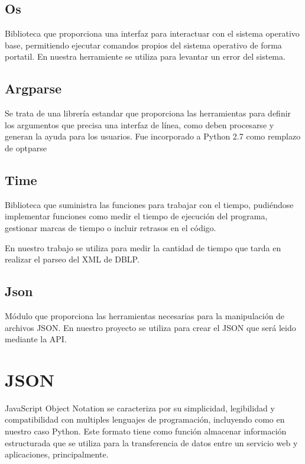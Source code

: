 \documentclass[a4paper, 12pt]{book}
\begin{document}
\subsection{Os}

Biblioteca que proporciona una interfaz para interactuar con el sistema operativo base, permitiendo ejecutar comandos propios del sistema operativo de forma portatil. En nuestra herramiente se utiliza para levantar un error del sistema.

\subsection{Argparse}

Se trata de una librería estandar que proporciona las herramientas para definir los argumentos que precisa una interfaz de línea, como deben procesarse y generan la ayuda para los usuarios. Fue incorporado a Python 2.7 como remplazo de optparse

\subsection{Time}

Biblioteca que suministra las funciones para trabajar con el tiempo, pudiéndose implementar funciones como medir el tiempo de ejecución del programa, gestionar marcas de tiempo o incluir retrasos en el código.

En nuestro trabajo se utiliza para medir la cantidad de tiempo que tarda en realizar el parseo del XML de DBLP.

\subsection{Json}

Módulo que proporciona las herramientas necesarias para la manipulación de archivos JSON. En nuestro proyecto se utiliza para crear el JSON que será leido mediante la API.

\section{JSON} 
\label{sec:seccion1}

JavaScript Object Notation se caracteriza por su simplicidad, legibilidad y compatibilidad con multiples lenguajes de programación, incluyendo como en nuestro caso Python.
Este formato tiene como función almacenar información estructurada que se utiliza para la transferencia de datos entre un servicio web y aplicaciones, principalmente.
\end{document}
